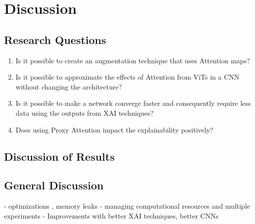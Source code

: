 \chapter{Discussion} \label{ch:discussion}
\section{Research Questions}
\begin{enumerate}
    \item Is it possible to create an augmentation technique that uses Attention maps?
    \item Is it possible to approximate the effects of Attention from ViTs in a CNN without changing the architecture?
    \item Is it possible to make a network converge faster and consequently require less data using the outputs from XAI techniques?
    \item Does using Proxy Attention impact the explainability positively?
\end{enumerate}


\section{Discussion of Results}

\section{General Discussion}
- optimizations , memory leaks
- managing computational resources and multiple experiments
- Improvements with better XAI techniques, better CNNs